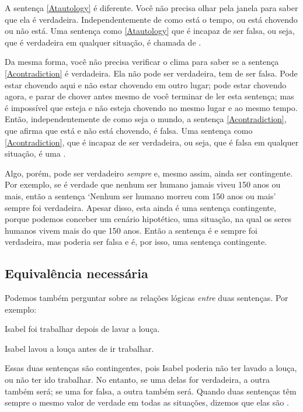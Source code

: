 A sentença \ref{Atautology} é diferente.
Você não precisa olhar pela janela para saber que ela é verdadeira. Independentemente de como está o tempo, ou está chovendo ou não está.
Uma sentença como \ref{Atautology} que é incapaz de ser falsa, ou seja, que é verdadeira em qualquer situação, é chamada de .

Da mesma forma, você não precisa verificar o clima para saber se a sentença \ref{Acontradiction} é verdadeira.
Ela não pode ser verdadeira, tem de ser falsa.
Pode estar chovendo aqui e não estar chovendo em outro lugar; pode estar chovendo agora, e parar de chover antes mesmo de você terminar de ler esta sentença; mas é impossível que esteja e não esteja chovendo no mesmo lugar e ao mesmo tempo.
Então, independentemente de como seja o mundo, a sentença \ref{Acontradiction}, que afirma que está e não está chovendo, é falsa.
Uma sentença como \ref{Acontradiction}, que é incapaz de ser verdadeira, ou seja, que é falsa em qualquer situação, é uma .

Algo, porém, pode ser verdadeiro \emph{sempre} e, mesmo assim, ainda ser contingente. Por exemplo, se é verdade que nenhum ser humano jamais viveu 150 anos ou mais, então a sentença `Nenhum ser humano morreu com 150 anos ou mais' sempre foi verdadeira.
Apesar disso, esta ainda é uma sentença contingente, porque podemos conceber um cenário hipotético, uma situação, na qual os seres humanos vivem mais do que 150 anos.
Então a sentença é e sempre foi verdadeira, mas poderia ser falsa e é, por isso, uma sentença contingente.

\subsection{Equivalência necessária}

Podemos também perguntar sobre as relações lógicas \emph{entre} duas sentenças.
Por exemplo:
\begin{earg}
\item[] Isabel foi trabalhar depois de lavar a louça.
\item[] Isabel lavou a louça antes de ir trabalhar.
\end{earg}
Essas duas sentenças são contingentes, pois Isabel poderia não ter lavado a louça, ou não ter ido trabalhar.
No entanto, se uma delas for verdadeira, a outra também será; se uma for falsa, a outra também será.
Quando duas sentenças têm sempre o mesmo valor de verdade em todas as situações, dizemos que elas são .

